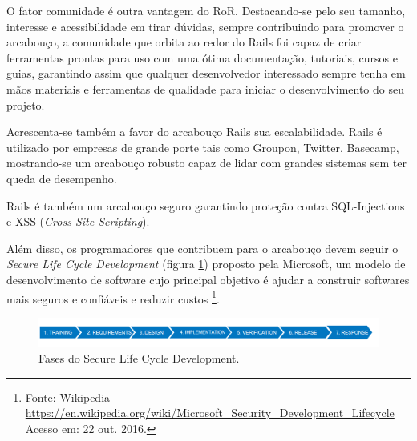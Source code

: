 \par O fator comunidade é outra vantagem do RoR. Destacando-se pelo seu tamanho, interesse e acessibilidade em tirar dúvidas, sempre contribuindo para promover o arcabouço, a comunidade que orbita ao redor do Rails foi capaz de criar ferramentas prontas para uso com uma ótima documentação, tutoriais, cursos e guias, garantindo assim que qualquer desenvolvedor interessado sempre tenha em mãos materiais e ferramentas de qualidade para iniciar o desenvolvimento do seu projeto. \citep{lilia:16}
\par Acrescenta-se também a favor do arcabouço Rails sua escalabilidade. Rails é utilizado por empresas de grande porte tais como Groupon, Twitter, Basecamp, mostrando-se um arcabouço robusto capaz de lidar com grandes sistemas sem ter queda de desempenho. \citep{lilia:16}
\par Rails é também um arcabouço seguro garantindo proteção contra SQL-Injections e XSS (\emph{Cross Site Scripting}).
\par Além disso, os programadores que contribuem para o arcabouço devem seguir o \emph{Secure Life Cycle Development} (figura \ref{fig:security_dev_lifecycle}) proposto pela Microsoft, um modelo de desenvolvimento de software cujo principal objetivo é ajudar a construir softwares mais seguros e confiáveis e reduzir custos \footnote{Fonte: Wikipedia \url{https://en.wikipedia.org/wiki/Microsoft_Security_Development_Lifecycle} Acesso em: 22 out. 2016.}.
\begin{figure}[htb]
\centering
\includegraphics[width=15cm]{figuras/security_dev_lifecycle}
\caption{\label{fig:security_dev_lifecycle} Fases do Secure Life Cycle Development.}
\end{figure}
